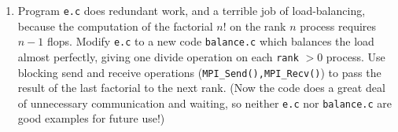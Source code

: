 \begin{enumerate}
\item \label{exer:gs:balance} Program \texttt{e.c} does redundant work, and a terrible job of load-balancing, because the computation of the factorial $n!$ on the rank $n$ process requires $n-1$ flops.  Modify \texttt{e.c} to a new code \texttt{balance.c} which balances the load almost perfectly, giving one divide operation on each \texttt{rank} $>0$ process.  Use blocking send and receive operations (\texttt{MPI\_Send(),MPI\_Recv()}) to pass the result of the last factorial to the next rank.  (Now the code does a great deal of unnecessary communication and waiting, so neither \texttt{e.c} nor \texttt{balance.c} are good examples for future use!)

\end{enumerate}
